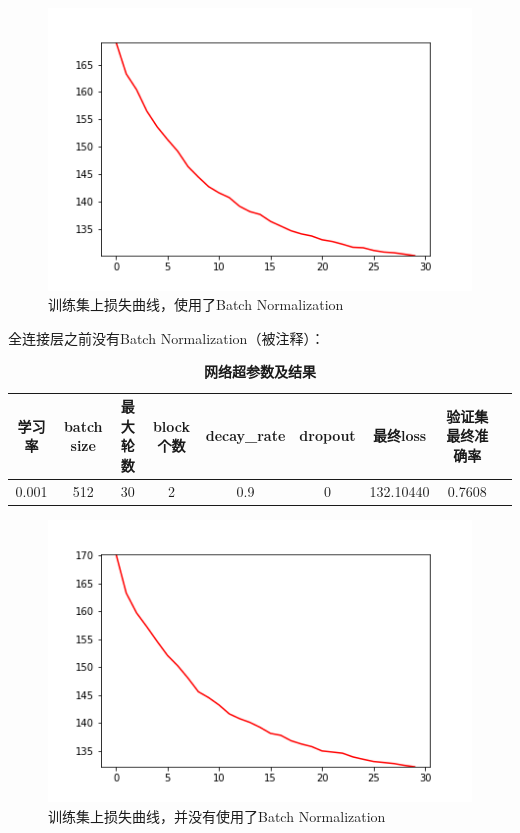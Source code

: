 \documentclass{article}
\begin{document}
\clearpage
\begin{figure}[!ht]
	\centering %
	\includegraphics[scale=0.5]{runing-loss-4.png}
	\caption{训练集上损失曲线，使用了Batch Normalization}
\end{figure}

全连接层之前没有Batch Normalization（被注释）：
\begin{table}[!ht]
	\caption{\textbf{网络超参数及结果}}%
	\centering%
	\begin{tabular}{ccccccccc}
		\hline
		学习率    & batch size & 最大轮数 & block个数 & decay\_rate & dropout & 最终loss & 验证集最终准确率\\ \hline
		0.001 & 512    & 30  &  2  & 0.9 &0 & 132.10440  & 0.7608   \\ \hline
	\end{tabular}
\end{table}

\begin{figure}[!ht]
	\centering %
	\includegraphics[scale=0.5]{runing-loss-10.png}
	\caption{训练集上损失曲线，并没有使用了Batch Normalization}
\end{figure}
\end{document}
